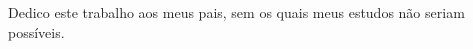 \begin{dedicatoria}
   \vspace*{\fill}
   Dedico este trabalho aos meus pais, sem os quais meus estudos não seriam possíveis.
\end{dedicatoria}
